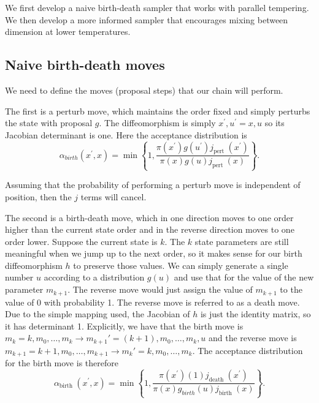 \documentclass[11pt]{article}
\begin{document}
We first develop a naive birth-death sampler that works with parallel tempering. 
We then develop a more informed sampler that encourages mixing between dimension at lower temperatures.

\subsection{Naive birth-death moves}

We need to define the moves (proposal steps) that our chain will perform.

The first is a perturb move, which maintains the order fixed and simply perturbs the state with proposal $g$. The diffeomorphism is simply $x^{\prime}, u^{\prime}=x, u$ so its Jacobian determinant is one. Here the acceptance distribution is
\begin{equation}
\alpha_{b i r t h}\left(x^{\prime}, x\right)=\min \left\{1, \frac{\pi\left(x^{\prime}\right) g\left(u^{\prime}\right) j_{\text {pert }}\left(x^{\prime}\right)}{\pi(x) g(u) j_{\text {pert }}(x)}\right\}
. \end{equation}

Assuming that the probability of performing a perturb move is independent of position, then the $j$ terms will cancel.

The second is a birth-death move, which in one direction moves to one order higher than the current state order and in the reverse direction moves to one order lower. Suppose the current state is $k$. The $k$ state parameters are still meaningful when we jump up to the next order, so it makes sense for our birth diffeomorphism $h$ to preserve those values. We can simply generate a single number $u$ according to a distribution $g(u)$ and use that for the value of the new parameter $m_{k+1}$. The reverse move would just assign the value of $m_{k+1}$ to the value of $0$ with probability 1. The reverse move is referred to as a death move. Due to the simple mapping used, the Jacobian of $h$ is just the identity matrix, so it has determinant 1. Explicitly, we have that the birth move is $ m_k = k, m_0, \dots, m_{k} \to m_{k+1}' = (k+1), m_0, \dots, m_k, u$ and the reverse move is $ m_{k+1} = k+1, m_0, \dots, m_{k+1} \to m_k' = k, m_0, \dots, m_k$. 
 The acceptance distribution for the birth move is therefore
\begin{equation}
\alpha_{\text {birth }}\left(x^{\prime}, x\right)=\min \left\{1, \frac{\pi\left(x^{\prime}\right)(1) j_{\text {death }}\left(x^{\prime}\right)}{\pi(x) g_{b i r t h}(u) j_{\text {birth }}(x)}\right\}
. \end{equation}
\end{document}
